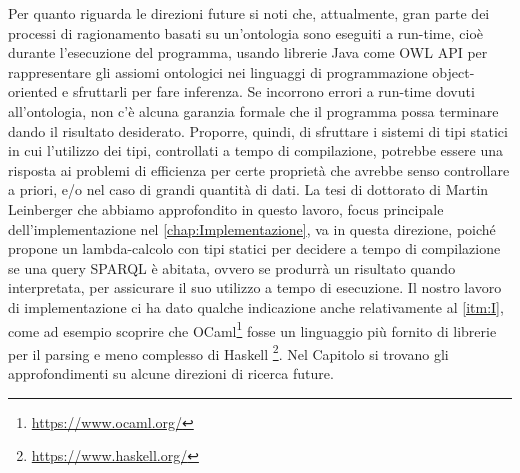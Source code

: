 Per quanto riguarda le direzioni future si noti che, attualmente, gran parte dei processi di ragionamento basati su un'ontologia sono eseguiti a run-time, cioè durante l'esecuzione del programma, usando librerie Java come OWL API \cite{OWLAPI} per rappresentare gli assiomi ontologici nei linguaggi di programmazione object-oriented e sfruttarli per fare inferenza. Se incorrono errori a run-time dovuti all'ontologia, non c'è alcuna garanzia formale che il programma possa terminare dando il risultato desiderato. Proporre, quindi, di sfruttare i sistemi di tipi statici in cui l'utilizzo dei tipi, controllati a tempo di compilazione, potrebbe essere una risposta ai problemi di efficienza per certe proprietà che avrebbe senso controllare a priori, e/o nel caso di grandi quantità di dati. La tesi di dottorato di Martin Leinberger \cite{leinbergerphdthesis} che abbiamo approfondito in questo lavoro, focus principale dell'implementazione nel \autoref{chap:Implementazione}, va in questa direzione, poiché propone un lambda-calcolo con tipi statici per decidere a tempo di compilazione se una query SPARQL è abitata, ovvero se produrrà un risultato quando interpretata, per assicurare il suo utilizzo a tempo di esecuzione. Il nostro lavoro di implementazione ci ha dato qualche indicazione anche relativamente al \autoref{itm:I}, come ad esempio scoprire che OCaml\footnote{\url{https://www.ocaml.org/}} fosse un linguaggio più fornito di librerie per il parsing e meno complesso di Haskell \footnote{\url{https://www.haskell.org/}}. Nel Capitolo %
si trovano gli approfondimenti su alcune direzioni di ricerca future.

